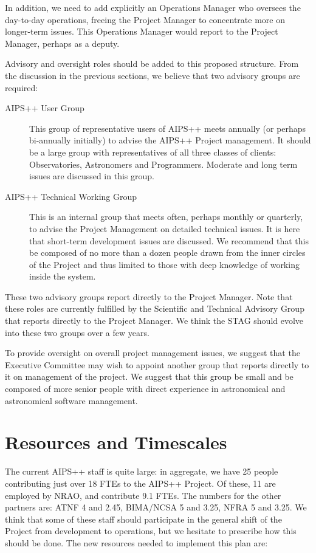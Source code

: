 In addition, we need to add explicitly an Operations Manager
who oversees the day-to-day operations, freeing the Project Manager to
concentrate more on longer-term issues. This Operations Manager would
report to the Project Manager, perhaps as a deputy.

Advisory and oversight roles should be added to this proposed
structure. From the discussion in the previous sections, we believe
that two advisory groups are required:

\begin{description}
\item[AIPS++ User Group] This group of representative users of AIPS++ 
meets annually (or perhaps bi-annually initially) to advise the AIPS++
Project management.  It should be a large group with representatives
of all three classes of clients: Observatories, Astronomers and
Programmers. Moderate and long term issues are discussed in this
group.
\item[AIPS++ Technical Working Group] This is an internal group that
meets often, perhaps monthly or quarterly, to advise the Project
Management on detailed technical issues. It is here that short-term
development issues are discussed. We recommend that this be composed of
no more than a dozen people drawn from the inner circles of the Project
and thus limited to those with deep knowledge of working inside the
system.
\end{description}

These two advisory groups report directly to the Project Manager. Note
that these roles are currently fulfilled by the Scientific and Technical
Advisory Group that reports directly to the Project Manager. We think the
STAG should evolve into these two groups over a few years.

To provide oversight on overall project management issues, we suggest
that the Executive Committee may wish to appoint another group that
reports directly to it on management of the project. We suggest that
this group be small and be composed of more senior people with direct
experience in astronomical and astronomical software management.

\section{Resources and Timescales}

The current AIPS++ staff is quite large: in aggregate, we have 25
people contributing just over 18 FTEs to the AIPS++ Project. Of these,
11 are employed by NRAO, and contribute 9.1 FTEs. The numbers for the
other partners are: ATNF 4 and 2.45, BIMA/NCSA 5 and 3.25, NFRA 5 and
3.25. We think that some of these staff should participate in the
general shift of the Project from development to operations, but we
hesitate to prescribe how this should be done. The new resources
needed to implement this plan are:

